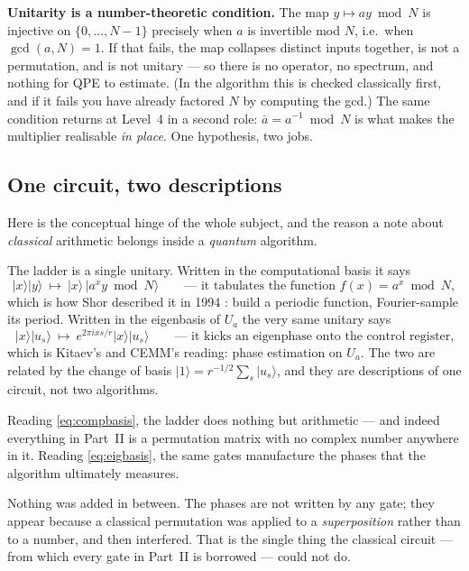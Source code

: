 \documentclass[11pt]{article}
\renewcommand{\ket}[1]{\lvert #1 \rangle}
\theoremstyle{plain}
\theoremstyle{remark}
\begin{document}
\medskip\noindent
\textbf{Unitarity is a number-theoretic condition.} The map $y\mapsto ay\bmod N$ is injective on
$\{0,\dots,N{-}1\}$ precisely when $a$ is invertible mod $N$, i.e.\ when $\gcd(a,N)=1$. If that
fails, the map collapses distinct inputs together, is not a permutation, and is not unitary --- so
there is no operator, no spectrum, and nothing for QPE to estimate. (In the algorithm this is
checked classically first, and if it fails you have already factored $N$ by computing the gcd.) The
same condition returns at Level~4 in a second role: $\bar a=a^{-1}\bmod N$ is what makes the
multiplier realisable \emph{in place}. One hypothesis, two jobs.

\subsection{One circuit, two descriptions}\label{sec:dual}

Here is the conceptual hinge of the whole subject, and the reason a note about \emph{classical}
arithmetic belongs inside a \emph{quantum} algorithm.

The ladder is a single unitary. Written in the computational basis it says
\begin{equation}\label{eq:compbasis}
\ket x\ket y\ \longmapsto\ \ket x\,\ket{a^xy\bmod N}
\qquad\text{--- it tabulates the function }f(x)=a^x\bmod N,
\end{equation}
which is how Shor described it in 1994 \cite{shor}: build a periodic function, Fourier-sample its
period. Written in the eigenbasis of $U_a$ the very same unitary says
\begin{equation}\label{eq:eigbasis}
\ket x\ket{u_s}\ \longmapsto\ e^{2\pi i xs/r}\ket x\ket{u_s}
\qquad\text{--- it kicks an eigenphase onto the control register,}
\end{equation}
which is Kitaev's \cite{kitaev} and CEMM's \cite{cemm} reading: phase estimation on $U_a$. The two
are related by the change of basis $\ket1=r^{-1/2}\sum_s\ket{u_s}$, and they are descriptions of
one circuit, not two algorithms.

\begin{keybox}[title={Why this matters for the arithmetic}]
Reading \eqref{eq:compbasis}, the ladder does nothing but arithmetic --- and indeed everything in
Part~II is a permutation matrix with no complex number anywhere in it. Reading
\eqref{eq:eigbasis}, the same gates manufacture the phases that the algorithm ultimately measures.

Nothing was added in between. The phases are not written by any gate; they appear because a
classical permutation was applied to a \emph{superposition} rather than to a number, and then
interfered. That is the single thing the classical circuit --- from which every gate in Part~II is
borrowed --- could not do.
\end{keybox}
\end{document}
